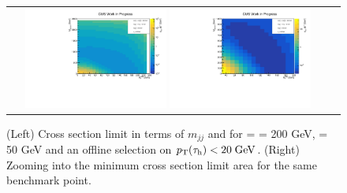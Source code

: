 \begin{figure}[tbh!]
	\centering
	\begin{tabular}{cc}
		\includegraphics[width=0.45\textwidth]{analysis/pics/JetInvMass_vs_MET_xsec_chi200_lsp050_taupt20.pdf}
		\includegraphics[width=0.45\textwidth]{analysis/pics/JetInvMass_vs_MET_xsec_chi200_lsp050_taupt20_zoom.pdf} 		
	\end{tabular}
	\caption{(Left) Cross section limit in terms of $m_{jj}$ and \met for \charginopm = \neutralinotwo = 200 GeV, \neutralinoone = 50 GeV and an offline selection on $p_{\text{T}}(\tau_{\text{h}}) <  20\;\text{Ge}\kern-0.06667em\text{V}$. (Right) Zooming into the minimum cross section limit area for the same benchmark point.}
	\label{fig::JetInvMass_vs_MET_xsec_chi200_lsp050_taupt20}
\end{figure}

